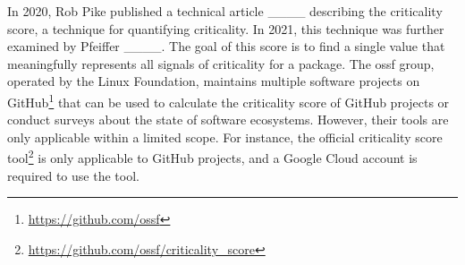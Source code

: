 
In 2020, Rob Pike published a technical article ____ describing the criticality score, a technique for quantifying criticality.
In 2021, this technique was further examined by Pfeiffer ____.
The goal of this score is to find a single value that meaningfully represents all signals of criticality for a package.
The \gls{ossf} group, operated by the Linux Foundation, maintains multiple software projects on GitHub\footnote{\url{https://github.com/ossf}} that can be used to calculate the criticality score of GitHub projects or conduct surveys about the state of software ecosystems.
However, their tools are only applicable within a limited scope.
For instance, the official criticality score tool\footnote{\url{https://github.com/ossf/criticality_score}} is only applicable to GitHub projects, and a Google Cloud account is required to use the tool.
